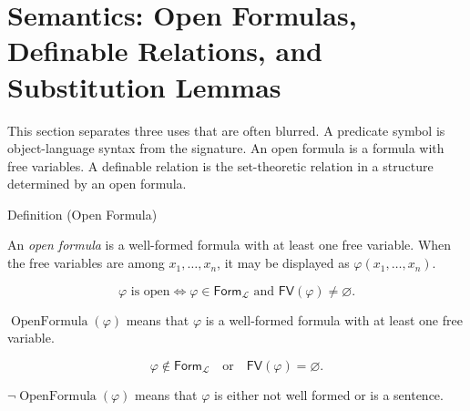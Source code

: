 
\section{Semantics: Open Formulas, Definable Relations, and Substitution Lemmas}

\begin{remark*}
This section separates three uses that are often blurred. A predicate symbol
is object-language syntax from the signature. An open formula is a formula
with free variables. A definable relation is the set-theoretic relation in a
structure determined by an open formula.
\end{remark*}

\begin{definitionbox}{Definition (Open Formula)}
\begin{definition}
\label{def:predicate}
An \emph{open formula} is a well-formed formula with at least one free
variable. When the free variables are among \(x_1,\ldots,x_n\), it may be
displayed as \(\varphi(x_1,\ldots,x_n)\).
\end{definition}
\end{definitionbox}

\begin{remark*}
\[
\varphi \text{ is open}
\Longleftrightarrow
\varphi\in\mathsf{Form}_{\mathcal L}
\text{ and }
\mathsf{FV}(\varphi)\neq\varnothing.
\]
\end{remark*}

\begin{remark*}
\(\operatorname{OpenFormula}(\varphi)\) means that \(\varphi\) is a
well-formed formula with at least one free variable.
\end{remark*}

\begin{remark*}
\[
\varphi\notin\mathsf{Form}_{\mathcal L}
\quad\text{or}\quad
\mathsf{FV}(\varphi)=\varnothing.
\]
\end{remark*}

\begin{remark*}
\(\neg\operatorname{OpenFormula}(\varphi)\) means that \(\varphi\) is either
not well formed or is a sentence.
\end{remark*}

